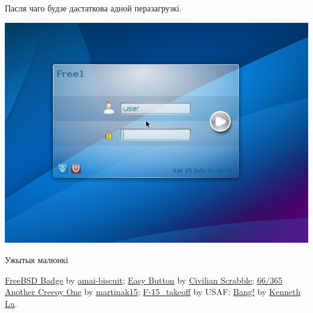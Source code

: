 \documentclass[ignorenonframetext,hyperref={pdftex,unicode}]{beamer}
\begin{document}
\begin{frame}
	Пасля чаго будзе дастаткова адной перазагрузкі.
	\begin{center}
 		\includegraphics[height=0.8\textheight,keepaspectratio]{KDM} %
	\end{center}
\end{frame}


\begin{frame}{Ужытыя малюнкі}
	\begin{thebibliography}{10}
	\beamertemplatetextbibitems
	\bibitem{}
		{\sc \href{http://amai-biscuit.deviantart.com/art/FreeBSD-Badge-345132138}{FreeBSD Badge}} by {\sc \href{http://amai-biscuit.deviantart.com/}{amai-biscuit}};
	\bibitem{}
		{\sc \href{https://www.flickr.com/photos/nmcmanus/338391435}{Easy Button}} by {\sc \href{https://www.flickr.com/photos/nmcmanus/}{Civilian Scrabble}};
	\bibitem{}
		{\sc \href{https://www.flickr.com/photos/martinaphotography/6428406857}{66/365 Another Creepy One}} by {\sc \href{https://www.flickr.com/photos/martinaphotography/}{martinak15}};
		{\sc \href{https://commons.wikimedia.org/wiki/File:F-15\_takeoff.jpg}{F-15\_takeoff}} by {\sc USAF};
	\bibitem{}
		{\sc \href{https://www.flickr.com/photos/toasty/914441359}{Bang!}} by {\sc \href{https://www.flickr.com/photos/toasty/}{Kenneth Lu}}.
	\end{thebibliography}
\end{frame}
\end{document}
